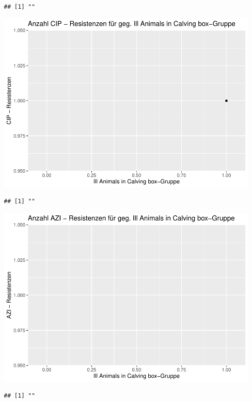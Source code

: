 \documentclass[
]{article}
\begin{document}
\begin{verbatim}
## [1] ""
\end{verbatim}

\includegraphics{NResistenzen_files/figure-latex/unnamed-chunk-7-22.pdf}

\begin{verbatim}
## [1] ""
\end{verbatim}

\includegraphics{NResistenzen_files/figure-latex/unnamed-chunk-7-23.pdf}

\begin{verbatim}
## [1] ""
\end{verbatim}
\end{document}
